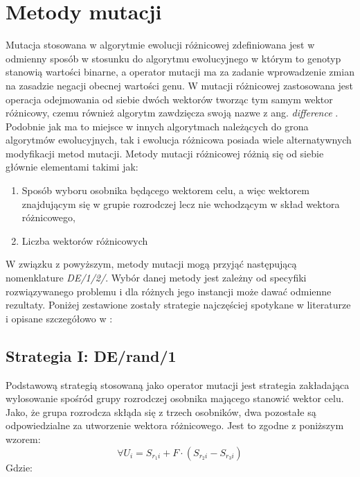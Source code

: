 \chapter{Metody mutacji}\label{cha:pierwszyDokument}

Mutacja stosowana w algorytmie ewolucji różnicowej zdefiniowana jest w odmienny sposób w stosunku do algorytmu ewolucyjnego w którym to genotyp stanowią wartości binarne, a operator mutacji ma za zadanie wprowadzenie zmian na zasadzie negacji obecnej wartości genu. W mutacji różnicowej zastosowana jest operacja odejmowania od siebie dwóch wektorów tworząc tym samym wektor różnicowy, czemu również algorytm zawdzięcza swoją nazwe z ang. \textsl{difference} \cite{przystojny_koles}. Podobnie jak ma to miejsce w innych algorytmach należących do grona algorytmów ewolucyjnych, tak i ewolucja różnicowa posiada wiele alternatywnych modyfikacji metod mutacji. Metody mutacji różnicowej różnią się od siebie głównie elementami takimi jak:

\begin{enumerate}
\item Sposób  wyboru osobnika będącego wektorem celu, a więc wektorem znajdującym się w grupie rozrodczej lecz nie wchodzącym w skład wektora różnicowego,
\item Liczba wektorów różnicowych
\end{enumerate}

W związku z powyższym, metody mutacji mogą przyjąć następującą nomenklature \textsl{DE/1/2/}. Wybór danej metody jest zależny od specyfiki rozwiązywanego problemu i dla różnych jego instancji może dawać odmienne rezultaty. Poniżej zestawione zostały strategie najczęściej spotykane w literaturze i opisane szczegółowo w \cite{doktorat}:

\section{Strategia I: DE/rand/1}\label{sec:strukturaDokumentu}

Podstawową strategią  stosowaną jako operator mutacji jest strategia zakładająca wylosowanie spośród grupy rozrodczej osobnika mającego stanowić wektor celu. Jako, że grupa rozrodcza skłąda się z trzech osobników, dwa pozostałe są odpowiedzialne za utworzenie wektora różnicowego. Jest to zgodne z poniższym wzorem:
$$
 \forall U_{i} =S_{r_{1}i} + F \cdot (S_{r_{2}i} - S_{r_{3}i})
$$
Gdzie:\\
$$

